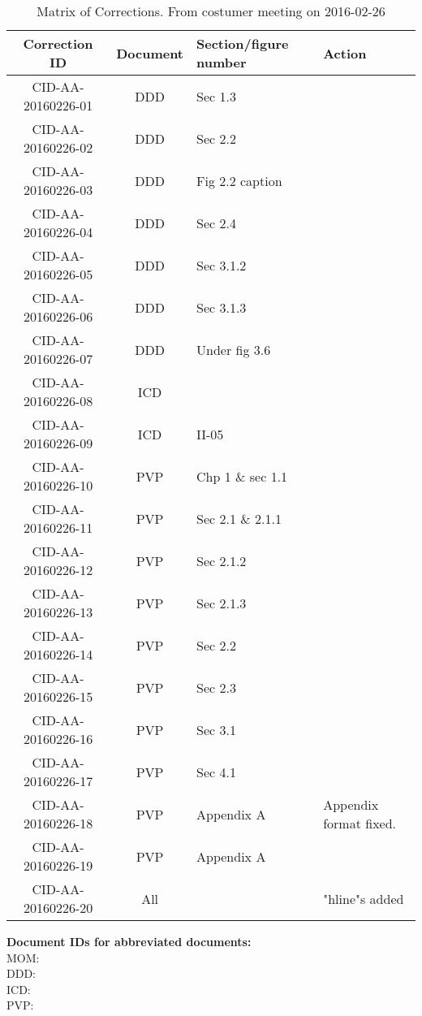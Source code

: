 \begin{table}[ht]
\centering
\begin{tabular}{|c|c|>{\centering\arraybackslash}p{3cm}|>{\centering\arraybackslash}p{5cm}|}
\hline \textbf{Correction ID} & \textbf{Document} & \textbf{Section/figure number} & \textbf{Action} \\ 
\hline CID-AA-20160226-01 & DDD & Sec 1.3 & \\ 
\hline CID-AA-20160226-02 & DDD & Sec 2.2 & \\ 
\hline CID-AA-20160226-03 & DDD & Fig 2.2 caption & \\ 
\hline CID-AA-20160226-04 & DDD & Sec 2.4 & \\ 
\hline CID-AA-20160226-05 & DDD & Sec 3.1.2 & \\ 
\hline CID-AA-20160226-06 & DDD & Sec 3.1.3 & \\ 
\hline CID-AA-20160226-07 & DDD & Under fig 3.6 & \\ 
\hline CID-AA-20160226-08 & ICD &  & \\ 
\hline CID-AA-20160226-09 & ICD & II-05 & \\ 
\hline CID-AA-20160226-10 & PVP & Chp 1 \& sec 1.1 & \\ 
\hline CID-AA-20160226-11 & PVP & Sec 2.1 \& 2.1.1 & \\ 
\hline CID-AA-20160226-12 & PVP & Sec 2.1.2 & \\ 
\hline CID-AA-20160226-13 & PVP & Sec 2.1.3 & \\ 
\hline CID-AA-20160226-14 & PVP & Sec 2.2 & \\ 
\hline CID-AA-20160226-15 & PVP & Sec 2.3 & \\ 
\hline CID-AA-20160226-16 & PVP & Sec 3.1 & \\ 
\hline CID-AA-20160226-17 & PVP & Sec 4.1 & \\ 
\hline CID-AA-20160226-18 & PVP & Appendix A & Appendix format fixed.\\ 
\hline CID-AA-20160226-19 & PVP & Appendix A & \\ 
\hline CID-AA-20160226-20 & All &  & "hline"s added \\
\hline 
\end{tabular}
\caption{Matrix of Corrections. From costumer meeting on 2016-02-26}
\label{tb:MoC} 
\end{table}

\vspace{20pt}
\noindent \textbf{Document IDs for abbreviated documents:}\\
MOM:        \momFebTwentySix \\
DDD:        \ddd \\
ICD:        \icd \\
PVP:        \pvp \\